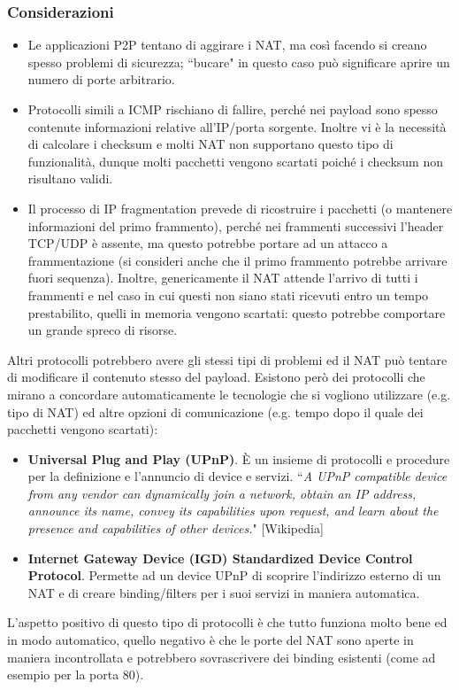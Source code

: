 \subsubsection{Considerazioni}
\begin{itemize}
	\item Le applicazioni P2P tentano di aggirare i NAT, ma così facendo si creano spesso problemi di sicurezza; \textquotedblleft bucare" in questo caso può significare aprire un numero di porte arbitrario.
	\item Protocolli simili a ICMP rischiano di fallire, perché nei payload sono spesso contenute informazioni relative all'IP/porta sorgente. Inoltre vi è la necessità di calcolare i checksum e molti NAT non supportano questo tipo di funzionalità, dunque molti pacchetti vengono scartati poiché i checksum non risultano validi.
	\item Il processo di IP fragmentation prevede di ricostruire i pacchetti (o mantenere informazioni del primo frammento), perché nei frammenti successivi l'header TCP/UDP è assente, ma questo potrebbe portare ad un attacco a frammentazione (si consideri anche che il primo frammento potrebbe arrivare fuori sequenza). Inoltre, genericamente il NAT attende l'arrivo di tutti i frammenti e nel caso in cui questi non siano stati ricevuti entro un tempo prestabilito, quelli in memoria vengono scartati: questo potrebbe comportare un grande spreco di risorse.
\end{itemize}
Altri protocolli potrebbero avere gli stessi tipi di problemi ed il NAT può tentare di modificare il contenuto stesso del payload. Esistono però dei protocolli che mirano a concordare automaticamente le tecnologie che si vogliono utilizzare (e.g. tipo di NAT) ed altre opzioni di comunicazione (e.g. tempo dopo il quale dei pacchetti vengono scartati):
\begin{itemize}
	\item \textbf{Universal Plug and Play (UPnP)}. È un insieme di protocolli e procedure per la definizione e l'annuncio di device e servizi. \textquotedblleft\textit{A UPnP compatible device from any vendor can dynamically join a network, obtain an IP address, announce its name, convey its capabilities upon request, and learn about the presence and capabilities of other devices.}" [Wikipedia]
	\item \textbf{Internet Gateway Device (IGD) Standardized Device Control Protocol}. Permette ad un device UPnP di scoprire l'indirizzo esterno di un NAT e di creare binding/filters per i suoi servizi in maniera automatica.
\end{itemize}
L'aspetto positivo di questo tipo di protocolli è che tutto funziona molto bene ed in modo automatico, quello negativo è che le porte del NAT sono aperte in maniera incontrollata e potrebbero sovrascrivere dei binding esistenti (come ad esempio per la porta 80).